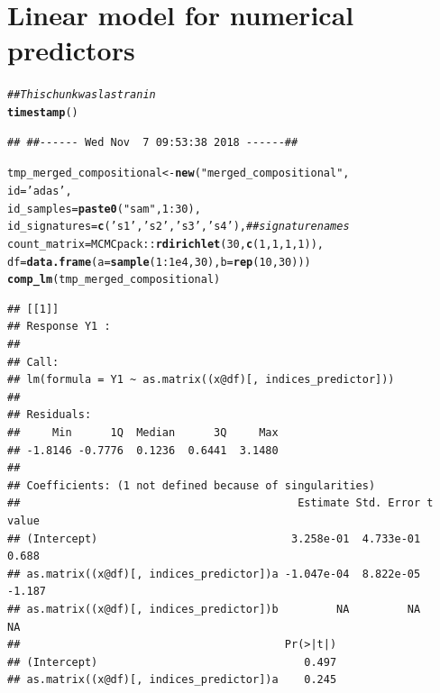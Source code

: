 \documentclass{article}\usepackage[]{graphicx}\usepackage[]{color}
\makeatletter
\newcommand{\hlnum}[1]{\textcolor[rgb]{0.686,0.059,0.569}{#1}}%
\newcommand{\hlstr}[1]{\textcolor[rgb]{0.192,0.494,0.8}{#1}}%
\newcommand{\hlcom}[1]{\textcolor[rgb]{0.678,0.584,0.686}{\textit{#1}}}%
\newcommand{\hlopt}[1]{\textcolor[rgb]{0,0,0}{#1}}%
\newcommand{\hlstd}[1]{\textcolor[rgb]{0.345,0.345,0.345}{#1}}%
\newcommand{\hlkwb}[1]{\textcolor[rgb]{0.69,0.353,0.396}{#1}}%
\newcommand{\hlkwc}[1]{\textcolor[rgb]{0.333,0.667,0.333}{#1}}%
\newcommand{\hlkwd}[1]{\textcolor[rgb]{0.737,0.353,0.396}{\textbf{#1}}}%
\newenvironment{kframe}{%
 \def\at@end@of@kframe{}%
 \ifinner\ifhmode%
  \def\at@end@of@kframe{\end{minipage}}%
  \begin{minipage}{\columnwidth}%
 \fi\fi%
 \def\FrameCommand##1{\hskip\@totalleftmargin \hskip-\fboxsep
 \colorbox{shadecolor}{##1}\hskip-\fboxsep
     \hskip-\linewidth \hskip-\@totalleftmargin \hskip\columnwidth}%
 \MakeFramed {\advance\hsize-\width
   \@totalleftmargin\z@ \linewidth\hsize
   \@setminipage}}%
 {\par\unskip\endMakeFramed%
 \at@end@of@kframe}
\newenvironment{knitrout}{}{} %
\makeatother
\begin{document}
\section{Linear model for numerical predictors}
\begin{knitrout}
\color{fgcolor}\begin{kframe}
\begin{alltt}
\hlcom{## This chunk was last ran in}
\hlkwd{timestamp}\hlstd{()}
\end{alltt}
\begin{verbatim}
## ##------ Wed Nov  7 09:53:38 2018 ------##
\end{verbatim}
\begin{alltt}
\hlstd{tmp_merged_compositional} \hlkwb{<-} \hlkwd{new}\hlstd{(}\hlstr{"merged_compositional"}\hlstd{,}
                                \hlkwc{id}\hlstd{=}\hlstr{'adas'}\hlstd{,}
                                \hlkwc{id_samples}\hlstd{=}\hlkwd{paste0}\hlstd{(}\hlstr{"sam"}\hlstd{,} \hlnum{1}\hlopt{:}\hlnum{30}\hlstd{),}
                                \hlkwc{id_signatures}\hlstd{=} \hlkwd{c}\hlstd{(}\hlstr{'s1'}\hlstd{,} \hlstr{'s2'}\hlstd{,} \hlstr{'s3'}\hlstd{,} \hlstr{'s4'}\hlstd{),} \hlcom{## signature names}
                                \hlkwc{count_matrix}\hlstd{=MCMCpack}\hlopt{::}\hlkwd{rdirichlet}\hlstd{(}\hlnum{30}\hlstd{,} \hlkwd{c}\hlstd{(}\hlnum{1}\hlstd{,}\hlnum{1}\hlstd{,}\hlnum{1}\hlstd{,}\hlnum{1}\hlstd{)),}
                                \hlkwc{df}\hlstd{=}\hlkwd{data.frame}\hlstd{(}\hlkwc{a}\hlstd{=}\hlkwd{sample}\hlstd{(}\hlnum{1}\hlopt{:}\hlnum{1e4}\hlstd{,} \hlnum{30}\hlstd{),} \hlkwc{b}\hlstd{=}\hlkwd{rep}\hlstd{(}\hlnum{10}\hlstd{,} \hlnum{30}\hlstd{)))}
\hlkwd{comp_lm}\hlstd{(tmp_merged_compositional)}
\end{alltt}
\begin{verbatim}
## [[1]]
## Response Y1 :
## 
## Call:
## lm(formula = Y1 ~ as.matrix((x@df)[, indices_predictor]))
## 
## Residuals:
##     Min      1Q  Median      3Q     Max 
## -1.8146 -0.7776  0.1236  0.6441  3.1480 
## 
## Coefficients: (1 not defined because of singularities)
##                                           Estimate Std. Error t value
## (Intercept)                              3.258e-01  4.733e-01   0.688
## as.matrix((x@df)[, indices_predictor])a -1.047e-04  8.822e-05  -1.187
## as.matrix((x@df)[, indices_predictor])b         NA         NA      NA
##                                         Pr(>|t|)
## (Intercept)                                0.497
## as.matrix((x@df)[, indices_predictor])a    0.245

\end{verbatim}
\end{kframe}
\end{knitrout}
\end{document}
